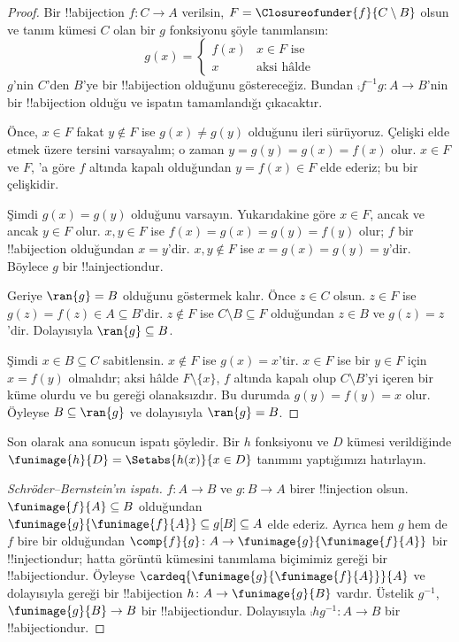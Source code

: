\documentclass[../../../include/open-logic-section]{subfiles}
\begin{document}
\begin{proof}
Bir !!a{bijection} $f\colon C\to A$ verilsin,
$F=\Closureofunder{f}{C\setminus B}$ olsun ve tanım kümesi $C$ olan bir $g$
fonksiyonu şöyle tanımlansın:
\[
	g(x) =
	\begin{cases}
			f(x) &\text{$x \in F$ ise}\\
			x & \text{aksi hâlde}
		\end{cases}
\]
$g$'nin $C$'den $B$'ye bir !!a{bijection} olduğunu göstereceğiz. Bundan
$\comp{f^{-1}}{g}\colon A\to B$'nin bir !!a{bijection} olduğu ve ispatın
tamamlandığı çıkacaktır.

Önce, $x\in F$ fakat $y\notin F$ ise $g(x)\neq g(y)$ olduğunu ileri sürüyoruz.
Çelişki elde etmek üzere tersini varsayalım; o zaman
$y=g(y)=g(x)=f(x)$ olur. $x\in F$ ve $F$,
'a göre $f$ altında kapalı olduğundan
$y=f(x)\in F$ elde ederiz; bu bir çelişkidir.

Şimdi $g(x)=g(y)$ olduğunu varsayın. Yukarıdakine göre $x\in F$, ancak ve
ancak $y\in F$ olur. $x,y\in F$ ise $f(x)=g(x)=g(y)=f(y)$ olur; $f$ bir
!!a{bijection} olduğundan $x=y$'dir. $x,y\notin F$ ise
$x=g(x)=g(y)=y$'dir. Böylece $g$ bir !!a{injection}{}dur.

Geriye $\ran{g}=B$ olduğunu göstermek kalır. Önce $z\in C$ olsun.
$z\in F$ ise $g(z)=f(z)\in A\subseteq B$'dir. $z\notin F$ ise
$C\setminus B\subseteq F$ olduğundan $z\in B$ ve $g(z)=z$'dir. Dolayısıyla
$\ran{g}\subseteq B$.

Şimdi $x\in B\subseteq C$ sabitlensin. $x\notin F$ ise $g(x)=x$'tir.
$x\in F$ ise bir $y\in F$ için $x=f(y)$ olmalıdır; aksi hâlde
$F\setminus\{x\}$, $f$ altında kapalı olup $C\setminus B$'yi içeren bir
küme olurdu ve bu  gereği olanaksızdır. Bu durumda
$g(y)=f(y)=x$ olur. Öyleyse $B\subseteq\ran{g}$ ve dolayısıyla
$\ran{g}=B$.
\end{proof}

Son olarak ana sonucun ispatı şöyledir. Bir $h$ fonksiyonu ve $D$ kümesi
verildiğinde $\funimage{h}{D}=\Setabs{h(x)}{x\in D}$ tanımını yaptığımızı
hatırlayın.

\begin{proof}[Schr\"oder--Bernstein'ın ispatı] $f\colon A\to B$ ve
$g\colon B\to A$ birer !!{injection} olsun. $\funimage{f}{A}\subseteq B$
olduğundan
$\funimage{g}{\funimage{f}{A}}\subseteq g[B]\subseteq A$ elde ederiz.
Ayrıca hem $g$ hem de $f$ bire bir olduğundan
$\comp{f}{g}\colon A\to\funimage{g}{\funimage{f}{A}}$ bir
!!{injection}{}dur; hatta görüntü kümesini tanımlama biçimimiz gereği bir
!!a{bijection}{}dur. Öyleyse
$\cardeq{\funimage{g}{\funimage{f}{A}}}{A}$ ve dolayısıyla
 gereği bir !!a{bijection}
$h\colon A\to\funimage{g}{B}$ vardır. Üstelik $g^{-1}$,
$\funimage{g}{B}\to B$ bir !!a{bijection}{}dur. Dolayısıyla
$\comp{h}{g^{-1}}\colon A\to B$ bir !!a{bijection}{}dur.
\end{proof}
\end{document}
